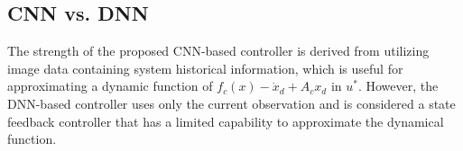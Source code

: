 \documentclass{l4dc2025}
\begin{document}

\subsection{CNN vs. DNN}

The strength of the proposed CNN-based controller is derived from utilizing image data containing system historical information, which is useful for approximating a dynamic function of $f_c(x)-\dot x_d+A_cx_d$ in $u^*$. However, the DNN-based controller uses only the current observation and is considered a state feedback controller that has a limited capability to approximate the dynamical function. %
\end{document}
